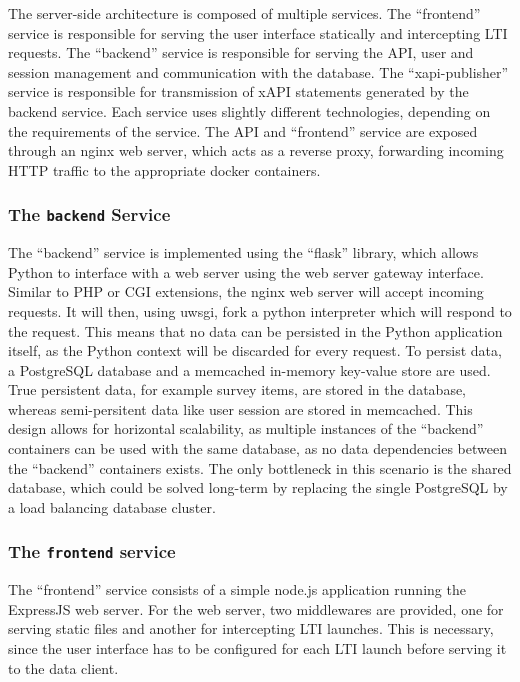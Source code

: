 \documentclass[a4paper,11pt]{article}
\def\inline{\lstinline[basicstyle=\ttfamily,keywordstyle={}]}
\begin{document}
            The server-side architecture is composed of multiple services.
            The ``frontend'' service is responsible for serving the
            user interface statically and intercepting LTI requests.
            The ``backend'' service is responsible for serving the API,
            user and session management and communication with the database.
            The ``xapi-publisher'' service is responsible for transmission
            of xAPI statements generated by the backend service.
            Each service uses slightly different technologies, depending
            on the requirements of the service. The API and ``frontend'' service
            are exposed through an nginx web server, which acts as a reverse
            proxy, forwarding incoming HTTP traffic to the appropriate docker
            containers.

            \subsubsection{The \inline{backend} Service}
                The ``backend'' service is implemented using the ``flask''
                library, which allows Python to interface with a web server
                using the web server gateway interface. Similar
                to PHP or CGI extensions, the nginx web server will accept incoming
                requests. It will then, using uwsgi, fork a python interpreter
                which will respond to the request. This means that no data
                can be persisted in the Python application itself, as the
                Python context will be discarded for every request.
                To persist data, a PostgreSQL database and a memcached
                in-memory key-value store are used.
                True persistent data, for example survey items, are stored
                in the database, whereas semi-persitent data like user
                session are stored in memcached. This design allows
                for horizontal scalability, as multiple instances of the
                ``backend'' containers can be used with the same database,
                as no data dependencies between the ``backend'' containers
                exists. The only bottleneck in this scenario is the shared database,
                which could be solved long-term by replacing the single PostgreSQL
                by a load balancing database cluster.

            \subsubsection{The \inline{frontend} service}
                The ``frontend'' service consists of a simple node.js
                application running the ExpressJS web server. For the
                web server, two middlewares are provided, one for
                serving static files and another for intercepting LTI launches.
                This is necessary, since the user interface has to be
                configured for each LTI launch before serving it to the data client.
\end{document}
